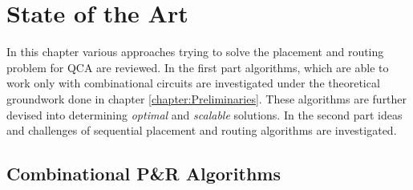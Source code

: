 \chapter{State of the Art}\label{chapter:SotA}
In this chapter various approaches trying to solve the placement and routing problem for QCA are reviewed. In the first part algorithms, which are able to work only with combinational circuits are investigated under the theoretical groundwork done in chapter \ref{chapter:Preliminaries}. These algorithms are further devised into determining \textit{optimal} and \textit{scalable} solutions. In the second part ideas and challenges of sequential placement and routing algorithms are investigated.

\section{Combinational P\&R Algorithms}
